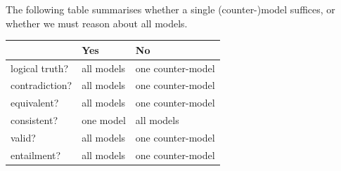 
The following table summarises whether a single (counter-)model suffices, or whether we must reason about all models.


\begin{highlighted}
		\begin{center}
	\begin{tabular}{l l l}
		& \textbf{Yes} & \textbf{No}\\
		\hline
		logical truth? & all models & one counter-model\\
		contradiction? &  all models  & one counter-model\\
		equivalent? & all models & one counter-model\\
		consistent? & one model & all models\\
		valid? & all models & one counter-model\\
		entailment? & all models & one counter-model\\
	\end{tabular}
\end{center}
\end{highlighted}
\label{table:ModelOrArgument}

